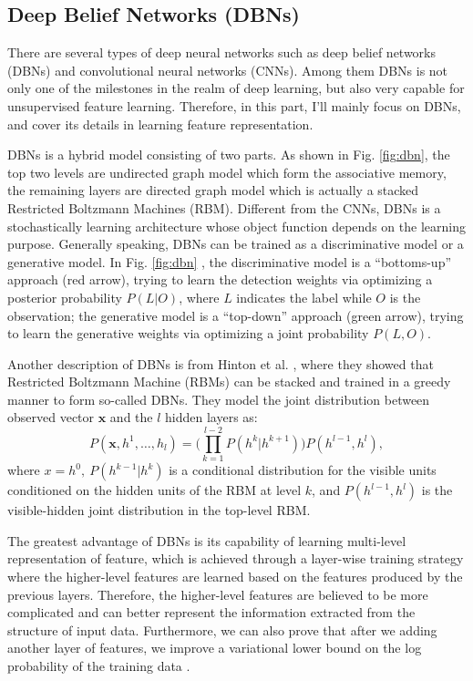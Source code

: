 \documentclass[conference]{IEEEtran}
\begin{document}
\subsection{Deep Belief Networks (DBNs)}

There are several types of deep neural networks such as deep belief networks (DBNs) and convolutional neural networks (CNNs). Among them DBNs is not only one of the milestones in the realm of deep learning, but also very capable for unsupervised feature learning. Therefore, in this part, I'll mainly focus on DBNs, and cover its details in learning feature representation.


DBNs is a hybrid model consisting of two parts. As shown in Fig. \ref{fig:dbn}, the top two levels are undirected graph model which form the associative memory, the remaining layers are directed graph model which is actually a stacked Restricted Boltzmann Machines (RBM). Different from the CNNs, DBNs is a stochastically learning architecture whose object
function depends on the learning purpose. Generally speaking, DBNs can be trained as a discriminative model or a generative model. In Fig. \ref{fig:dbn} , the discriminative model is a ``bottoms-up'' approach (red arrow), trying to
learn the detection weights via optimizing a posterior probability $P(L|O)$, where $L$ indicates the label while $O$ is the observation; the generative model is a ``top-down'' approach (green arrow), trying to learn the generative weights via optimizing a joint probability $P(L,O)$.


Another description of DBNs is from Hinton et al. \cite{Hinton}, where they showed that Restricted Boltzmann Machine (RBMs) can be stacked and trained in a greedy manner to form so-called DBNs. They model the joint distribution between observed vector $\mathbf{x}$ and the $l$ hidden layers as:
\begin{equation}
P(\mathbf{x},h^1,\ldots,h_l)=\Big(\prod_{k=1}^{l-2} P(h^k|h^{k+1})\Big)
P(h^{l-1},h^l),
\end{equation}
where $x=h^0,\ P(h^{k-1}|h^k)$ is a conditional distribution for the visible units conditioned on the hidden units of the RBM at level $k$, and $P(h^{l-1},h^l)$ is the visible-hidden joint distribution in the top-level RBM.


The greatest advantage of DBNs is its capability of learning multi-level representation of feature, which is achieved through a layer-wise training strategy where the higher-level features are learned based on the features produced by the previous layers. Therefore, the higher-level features are believed to be more complicated and can better represent the information extracted from the structure of input data. Furthermore, we can also prove that after we adding another layer of features, we improve a variational lower bound on the log probability of the training data \cite{Hinton}.
\end{document}
